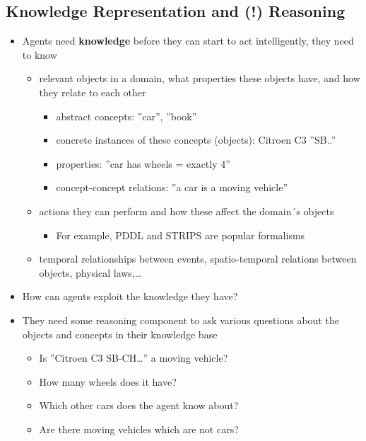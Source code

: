 \documentclass[conference, a4paper]{styles/acmsiggraph}
\begin{document}
    \subsection{Knowledge Representation and (!) Reasoning}
        \begin{itemize}
            \item Agents need \textbf{knowledge} before they can start to act intelligently, they need to know
                \begin{itemize}
                    \item relevant objects in a domain, what properties these objects have, and how they relate to each other
                        \begin{itemize}
                            \item abstract concepts: ''car'', ''book''
                            \item concrete instances of these concepts (objects): Citroen C3 ''SB..''
                            \item properties: ''car has wheels = exactly 4''
                            \item concept-concept relations: ''a car is a moving vehicle''
                        \end{itemize}
                    \item actions they can perform and how these affect the domain´s objects
                        \begin{itemize}
                            \item For example, PDDL and STRIPS are popular formalisms
                        \end{itemize}
                    \item temporal relationships between events, spatio-temporal relations between objects, physical laws,…
                \end{itemize}
            \item How can agents exploit the knowledge they have?
            \item They need some reasoning component to ask various questions about the objects and concepts in their knowledge base
                \begin{itemize}
                    \item Is ''Citroen C3 SB-CH…'' a moving vehicle?
                    \item How many wheels does it have?
                    \item Which other cars does the agent know about?
                    \item Are there moving vehicles which are not cars?
                \end{itemize}
        \end{itemize}
    
\end{document}
